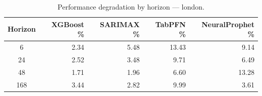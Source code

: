 \begin{table}[h]
\centering
\caption{Performance degradation by horizon — london.}
\label{tab:degradation_horizon_london}
\begin{tabular}{crrrr}
\toprule
Horizon & XGBoost \% & SARIMAX \% & TabPFN \% & NeuralProphet \% \\
\midrule
6 & 2.34 & 5.48 & 13.43 & 9.14 \\
24 & 2.52 & 3.48 & 9.71 & 6.49 \\
48 & 1.71 & 1.96 & 6.60 & 13.28 \\
168 & 3.44 & 2.82 & 9.99 & 3.61 \\
\bottomrule
\end{tabular}
\end{table}
